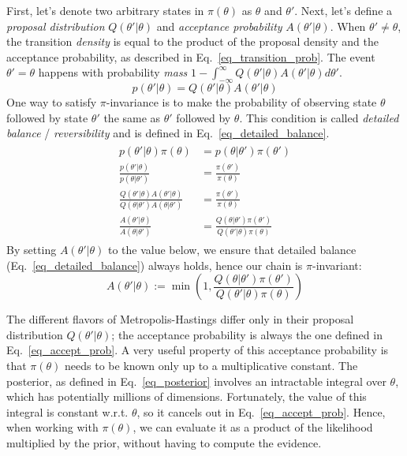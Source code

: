 \documentclass[12pt]{article}
\begin{document}
First, let's denote two arbitrary states in $\pi(\theta)$ as $\theta$ and $\theta'$. Next, let's define a \textit{proposal distribution} $Q(\theta'|\theta)$ and \textit{acceptance probability} $A(\theta'|\theta)$. When $\theta' \ne \theta$, the transition \textit{density} is equal to the product of the proposal density and the acceptance probability, as described in Eq.\ \ref{eq_transition_prob}. The event $\theta' = \theta$ happens with probability \textit{mass} $1-\int_{-\infty}^{\infty} Q(\theta'|\theta)A(\theta'|\theta) d\theta'$.
\begin{equation}
p(\theta'|\theta) = Q(\theta'|\theta)A(\theta'|\theta)
\label{eq_transition_prob}
\end{equation}
One way to satisfy $\pi$-invariance is to make the probability of observing state $\theta$ followed by state $\theta'$ the same as $\theta'$ followed by $\theta$. This condition is called \textit{detailed balance} / \textit{reversibility} and is defined in Eq.\ \ref{eq_detailed_balance}.
\begin{align}
\begin{split}
p(\theta'|\theta)\pi(\theta) &= p(\theta|\theta')\pi(\theta') \\
\frac{p(\theta'|\theta)}{p(\theta|\theta')} &= \frac{\pi(\theta')}{\pi(\theta)} \\
\frac{Q(\theta'|\theta)A(\theta'|\theta)}{Q(\theta|\theta')A(\theta|\theta')} &= \frac{\pi(\theta')}{\pi(\theta)} \\
\frac{A(\theta'|\theta)}{A(\theta|\theta')} &= \frac{Q(\theta|\theta')\pi(\theta')}{Q(\theta'|\theta)\pi(\theta)}
\label{eq_detailed_balance}
\end{split}
\end{align}
By setting $A(\theta'|\theta)$ to the value below, we ensure that detailed balance (Eq.\ \ref{eq_detailed_balance}) always holds, hence our chain is $\pi$-invariant:
\begin{equation}
A(\theta'|\theta) := \min \left(1, \frac{Q(\theta|\theta')\pi(\theta')}{Q(\theta'|\theta)\pi(\theta)} \right)
\label{eq_accept_prob}
\end{equation}

The different flavors of Metropolis-Hastings differ only in their proposal distribution $Q(\theta'|\theta)$; the acceptance probability is always the one defined in Eq.\ \ref{eq_accept_prob}. A very useful property of this acceptance probability is that $\pi(\theta)$ needs to be known only up to a multiplicative constant. The posterior, as defined in Eq.\ \ref{eq_posterior} involves an intractable integral over $\theta$, which has potentially millions of dimensions. Fortunately, the value of this integral is constant w.r.t. $\theta$, so it cancels out in Eq.\ \ref{eq_accept_prob}. Hence, when working with $\pi(\theta)$, we can evaluate it as a product of the likelihood multiplied by the prior, without having to compute the evidence.
\end{document}
